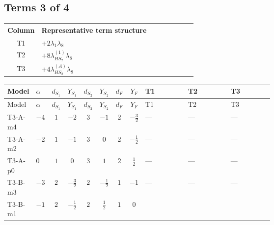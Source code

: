 \documentclass[8pt]{article}
\begin{document}
\begin{landscape}
\subsection*{Terms 3 of 4}
\begin{center}
\begin{tabular}{@{}c >{\raggedright\arraybackslash}p{0.82\linewidth}@{}}
\toprule
Column & Representative term structure \\
\midrule
T1 & \(\displaystyle +2 {\lambda_1} {\lambda_{8}}\) \\
\midrule
T2 & \(\displaystyle +8 {\lambda_{HS_2}^{(1)}} {\lambda_{8}}\) \\
\midrule
T3 & \(\displaystyle +4 {\lambda_{HS_2}^{(A)}} {\lambda_{8}}\) \\
\midrule
\bottomrule
\end{tabular}
\end{center}
\smallskip
\tiny
\begin{longtable}{@{}llcccccc >{\raggedright\arraybackslash}p{0.21\linewidth} >{\raggedright\arraybackslash}p{0.21\linewidth} >{\raggedright\arraybackslash}p{0.21\linewidth}@{}}
\toprule
Model & $\alpha$ & $d_{S_1}$ & $Y_{S_1}$ & $d_{S_2}$ & $Y_{S_2}$ & $d_F$ & $Y_F$ & T1 & T2 & T3 \\
\midrule
\endfirsthead
\toprule
Model & $\alpha$ & $d_{S_1}$ & $Y_{S_1}$ & $d_{S_2}$ & $Y_{S_2}$ & $d_F$ & $Y_F$ & T1 & T2 & T3 \\
\midrule
\endhead
T3-A-m4 & $-4$ & $1$ & $-2$ & $3$ & $-1$ & $2$ & $-\frac{3}{2}$ & --- & --- & --- \\
\midrule
T3-A-m2 & $-2$ & $1$ & $-1$ & $3$ & $0$ & $2$ & $-\frac{1}{2}$ & --- & --- & --- \\
\midrule
T3-A-p0 & $0$ & $1$ & $0$ & $3$ & $1$ & $2$ & $\frac{1}{2}$ & --- & --- & --- \\
\midrule
T3-B-m3 & $-3$ & $2$ & $-\frac{3}{2}$ & $2$ & $-\frac{1}{2}$ & $1$ & $-1$ & --- & --- & --- \\
\midrule
T3-B-m1 & $-1$ & $2$ & $-\frac{1}{2}$ & $2$ & $\frac{1}{2}$ & $1$ & $0$ & \scriptsize\adjustbox{max width=\linewidth}{$\begin{gathered} +2 {\lambda_1} {\lambda_{8}}\end{gathered}$} & \scriptsize\adjustbox{max width=\linewidth}{$\begin{gathered} +8 {\lambda_{HS_2}^{(1)}} {\lambda_{8}}\end{gathered}$} & \scriptsize\adjustbox{max width=\linewidth}{$\begin{gathered} +4 {\lambda_{HS_2}^{(A)}} {\lambda_{8}}\end{gathered}$} \\

\end{longtable}
\end{landscape}
\end{document}
